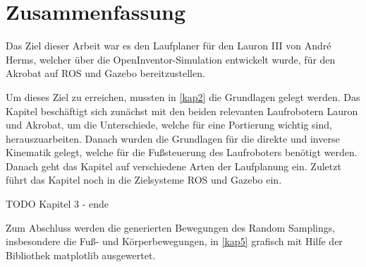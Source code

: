 \chapter{Zusammenfassung}
\label{kap7}

Das Ziel dieser Arbeit war es den Laufplaner für den Lauron III von André Herms, welcher über die OpenInventor-Simulation entwickelt wurde, für den Akrobat auf \ac{ROS} und Gazebo bereitzustellen.

Um dieses Ziel zu erreichen, mussten in \autoref{kap2} die Grundlagen gelegt werden. Das Kapitel beschäftigt sich zunächst mit den beiden relevanten Laufrobotern Lauron und Akrobat, um die Unterschiede, welche für eine  Portierung wichtig sind, herauszuarbeiten. Danach wurden die Grundlagen für die direkte und inverse Kinematik gelegt, welche für die Fußsteuerung des Laufroboters benötigt werden. Danach geht das Kapitel auf verschiedene Arten der Laufplanung ein. Zuletzt führt das Kapitel noch in die Zielsysteme \acf{ROS} und Gazebo ein.

TODO Kapitel 3 - ende

Zum Abschluss werden die generierten Bewegungen des Random Samplings, insbesondere die Fuß- und Körperbewegungen, in \autoref{kap5} grafisch mit Hilfe der Bibliothek matplotlib ausgewertet.